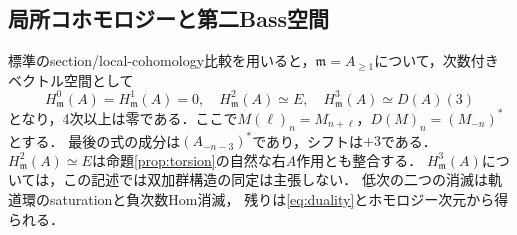 \documentclass[11pt,a4paper]{ltjsarticle}
\begin{document}
\subsection{局所コホモロジーと第二Bass空間}
標準のsection/local-cohomology比較を用いると，$\mathfrak m=A_{\geq1}$について，次数付きベクトル空間として
\begin{equation}\label{eq:localcohom}
 H^0_{\mathfrak m}(A)=H^1_{\mathfrak m}(A)=0,\quad
 H^2_{\mathfrak m}(A)\simeq E,\quad
 H^3_{\mathfrak m}(A)\simeq D(A)(3)
\end{equation}
となり，4次以上は零である．ここで$M(\ell)_n=M_{n+\ell}$，$D(M)_n=(M_{-n})^*$とする．
最後の式の成分は$(A_{-n-3})^*$であり，シフトは$+3$である．
$H^2_{\mathfrak m}(A)\simeq E$は命題\ref{prop:torsion}の自然な右$A$作用とも整合する．
$H^3_{\mathfrak m}(A)$については，この記述では双加群構造の同定は主張しない．
低次の二つの消滅は軌道環のsaturationと負次数Hom消滅，
残りは\eqref{eq:duality}とホモロジー次元から得られる．
\end{document}
